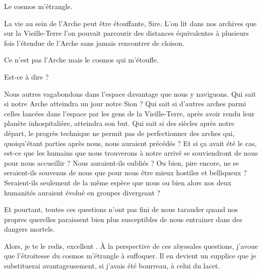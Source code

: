 \begin{drama}
  \elenaspeaks Le cosmos m’étrangle.

  \alexasspeaks La vie au sein de l’Arche peut être étouffante, Sire. L’on lit dans nos archives que sur la Vieille-Terre l’on pouvait parcourir des distances équivalentes à plusieurs fois l’étendue de l’Arche sans jamais rencontrer de cloison.

  \elenaspeaks Ce n’est pas l’Arche mais le cosmos qui m’étouffe.

  \alexasspeaks Est-ce à dire ?

  \elenaspeaks Nous autres vagabondons dans l’espace davantage que nous y naviguons. Qui sait si notre Arche atteindra un jour notre Sion ? Qui sait si d’autres arches parmi celles lancées dans l’espace par les gens de la Vieille-Terre, après avoir rendu leur planète inhospitalière, atteindra son but. Qui sait si des siècles après notre départ, le progrès technique ne permit pas de perfectionner des arches qui, quoiqu’étant parties après nous, nous auraient précédés ? Et si ça avait été le cas, est-ce que les humains que nous trouverons à notre arrivé se souviendront de nous pour nous accueillir ? Nous auraient-ils oubliés ? Ou bien, pire encore, ne se seraient-ils souvenus  de nous que pour nous être mieux hostiles et belliqueux ? Seraient-ils seulement de la même espèce que nous ou bien alors nos deux humanités auraient évolué en groupes divergeant ?

Et pourtant, toutes ces questions n’ont pas fini de nous tarauder quand nos propres querelles paraissent bien plus susceptibles de nous entrainer dans des dangers mortels.

  Alors, je te le redis, excellent \alexas. À la perspective de ces abyssales questions, j’avoue que l’étroitesse du cosmos m’étrangle à suffoquer. Il en devient un supplice que je substituerai avantageusement, si j’avais été bourreau, à celui du lacet.
\end{drama}

\scene


\StageDirII{\elena, \roi, \kingsgards}



